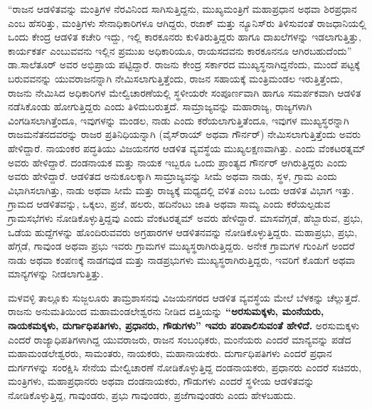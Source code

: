 “ರಾಜನ ಆಡಳಿತವನ್ನು ಮಂತ್ರಿಗಳ ನೆರವಿನಿಂದ ಸಾಗಿಸುತ್ತಿದ್ದನು, ಮುಖ್ಯಮಂತ್ರಿಗೆ ಮಹಾಪ್ರಧಾನ ಅಥವಾ ಶಿರಪ್ರಧಾನ ಎಂಬ ಹೆಸರಿತ್ತು, ಮಂತ್ರಿಗಳು ಸೇನಾಧಿಕಾರಿಗಳೂ ಆಗಿದ್ದರು, ರಜಾಕ್​ ಮತ್ತು ನ್ಯೂನಿಸ್​ರು ತಿಳಿಸುವಂತೆ ರಾಜಧಾನಿಯಲ್ಲಿ ಒಂದು ಕೇಂದ್ರ ಆಡಳಿತ ಕಚೇರಿ ಇದ್ದು, ಇಲ್ಲಿ ಕಾರಕೂನರು ಕುಳಿತಿರುತ್ತಿದ್ದರು ಹಾಗೂ ದಾಖಲೆಗಳನ್ನು ಇಡಲಾಗುತ್ತಿತ್ತು, ಕಾರ್ಯಕರ್ತ ಎಂಬುವವನು ಇಲ್ಲಿನ ಪ್ರಮುಖ ಅಧಿಕಾರಿಯೂ, ರಾಯಸದವನು ಕಾರಕೂನನೂ ಆಗಿರ\-ಬಹುದೆಂದು” ಡಾ.ಸಾಲೆತೂರ್​ ಅವರ ಅಭಿಪ್ರಾಯ ಪಟ್ಟಿದ್ದಾರೆ. ರಾಜನು ಕೇಂದ್ರ ಸರ್ಕಾರದ ಮುಖ್ಯಸ್ಥನಾಗಿದ್ದನೆಂದು, ಮುಂದೆ ಪಟ್ಟಕ್ಕೆ ಬರುವವನನ್ನು ಯುವರಾಜನನ್ನಾಗಿ ನೇಮಿಸಲಾಗುತ್ತಿತ್ತೆಂದು, ರಾಜನ ಸಹಾಯಕ್ಕೆ ಮಂತ್ರಿಮಂಡಲ ಇರುತ್ತಿ\-ತ್ತೆಂದು, ರಾಜನು ನೇಮಿಸಿದ ಅಧಿಕಾರಿಗಳ ಮೇಲ್ವಿಚಾರಣೆಯಲ್ಲಿ ಸ್ಥಳೀಯರೇ ಸಂಪೂರ್ಣವಾಗಿ ಹಾಗೂ ಸಮರ್ಪಕವಾಗಿ ಆಡಳಿತ ನಡೆಸಿಕೊಂಡು ಹೋಗುತ್ತಿದ್ದರು ಎಂದು ತಿಳಿದುಬರುತ್ತದೆ. ಸಾಮ್ರಾಜ್ಯವನ್ನು ಮಹಾರಾಜ್ಯ, ರಾಜ್ಯಗಳಾಗಿ ವಿಂಗಡಿಸಲಾಗಿತ್ತೆಂದೂ, ಇವುಗಳನ್ನು ಮಂಡಲ, ನಾಡು ಎಂದು ಕರೆಯಲಾಗುತ್ತಿತೆಂದೂ, ಇವುಗಳ ಮುಖ್ಯಸ್ಥರನ್ನಾಗಿ ರಾಜಮನೆತನದವರನ್ನು ರಾಜರ ಪ್ರತಿನಿಧಿಯನ್ನಾಗಿ (ವೈಸ್​ರಾಯ್​ ಅಥವಾ ಗೌರ್ನರ್​) ನೇಮಿಸಲಾಗುತ್ತಿತ್ತೆಂದು ಅವರು ಹೇಳಿದ್ದಾರೆ. ನಾಯಂಕರ ಪದ್ಧತಿಯು ವಿಜಯನಗರ ಆಡಳಿತ ವ್ಯವಸ್ಥೆಯ ಮುಖ್ಯಲಕ್ಷಣವಾಗಿತ್ತು.  ಎಂದು ವೆಂಕಟರತ್ನಮ್ ಅವರು ಹೇಳಿದ್ದಾರೆ. ದಂಡನಾಯಕ ಮತ್ತು ನಾಯಕ ಇಬ್ಬರೂ ಒಂದು ಪ್ರಾಂತ್ಯದ ಗೌರ್ನರ್​ ಆಗಿರುತ್ತಿದ್ದರು ಎಂದು ಅವರು ಹೇಳಿದ್ದಾರೆ. ಆಡಳಿತದ ಅನುಕೂಲಕ್ಕಾಗಿ ಸಾಮ್ರಾಜ್ಯವನ್ನು ಸೀಮೆ ಅಥವಾ ನಾಡು, ಸ್ಥಳ, ಗ್ರಾಮ ಎಂದು ವಿಭಾಗಿಸಲಾಗಿತ್ತು, ನಾಡು ಅಥವಾ ಸೀಮೆ ಮತ್ತು ರಾಜ್ಯಕ್ಕೆ ಮಧ್ಯದಲ್ಲಿ ವಳಿತ ಎಂಬ ಒಂದು ಆಡಳಿತ ವಿಭಾಗ ಇತ್ತು. ಗ್ರಾಮದ ಆಡಳಿತವನ್ನು, ಒಕ್ಕಲು, ಪ್ರಜೆ, ಹಲರು, ಹದಿನೆಂಟು ಜಾತಿ ಅಥವಾ ಸಾಮ್ಯ ಎಂದು ಕರೆಯಲ್ಪಡುವ ಗ್ರಾಮಸಭೆಗಳು ನೋಡಿಕೊಳ್ಳುತ್ತಿದ್ದವು ಎಂದು ವೆಂಕಟರತ್ನಮ್ ಅವರು ಹೇಳಿದ್ದಾರೆ. ಮಾಸವೆಗ್ಗಡೆ, ಹೆಬ್ಬಾರುವ, ಪ್ರಭು, ಒಡೆಯ ಹುದ್ದೆಗಳನ್ನು ಹೊಂದಿರುವವರು ಅಗ್ರಹಾರಗಳ ಆಡಳಿತನವನ್ನು ನೋಡಿಕೊಳ್ಳುತ್ತಿದ್ದರು. ಮಹಾಪ್ರಭು, ಪ್ರಭು, ಹೆಗ್ಗಡೆ, ಗಾವುಂಡ ಅಥವಾ ಪ್ರಭು ಇವರು ಗ್ರಾಮಗಳ ಮುಖ್ಯಸ್ಥರಾಗಿರುತ್ತಿದ್ದರು. ಅನೇಕ ಗ್ರಾಮಗಳ ಗುಂಪಿಗೆ ಅಂದರೆ ನಾಡು ಅಥವಾ ಕಂಪಣಕ್ಕೆ ನಾಡಗವುಡ ಮತ್ತು ನಾಡಪ್ರಭುಗಳು ಮುಖ್ಯಸ್ಥರಾಗಿರುತ್ತಿದ್ದರು, ಇವರಿಗೆ ಕೊಡುಗೆ ಅಥವಾ ಮಾನ್ಯಗಳನ್ನು ನೀಡಲಾಗುತ್ತಿತ್ತು.

ಮಳವಳ್ಳಿ ತಾಲ್ಲೂಕು ಸುಜ್ಜಲೂರು ತಾಮ್ರಶಾಸನವು ವಿಜಯನಗರದ ಆಡಳಿತ ವ್ಯವಸ್ಥೆಯ ಮೇಲೆ ಬೆಳಕನ್ನು ಚೆಲ್ಲುತ್ತದೆ. ರಾಜನು ಅನುಮತಿಯಿಂದ ಮಹಾಮಂಡಲೇಶ್ವರನು ನೀಡಿದ ದತ್ತಿಯನ್ನು \textbf{“ಅರಸುಮಕ್ಕಳು, ಮಂನೆಯರು, ನಾಯಕಮಕ್ಕಳು, ದುರ್ಗಾಧಿಪತಿಗಳು, ಪ್ರಧಾನರು, ಗೌಡುಗಳು” ಇವರು ಪರಿಪಾಲಿಸುವಂತೆ ಹೇಳಿದೆ.} ಅರಸುಮಕ್ಕಳು ಎಂದರೆ ರಾಜ್ಯಾಧಿಪತಿ\-ಗಳಾಗಿದ್ದ ಯುವರಾಜರು, ರಾಜನ ಸಂಬಂಧಿಕರು, ಮಂನೆಯರು ಎಂದರೆ ಮಾನ್ಯವನ್ನು ಪಡೆದ ಮಹಾಮಂಡಲೇಶ್ವರರು, ಸಾಮಂತರು, ನಾಯಕರು, ಮಹಾನಾಯಕರು. ದುರ್ಗಾಧಿಪತಿಗಳು ಎಂದರೆ ಪ್ರಧಾನ ದುರ್ಗಗಳನ್ನು ಸಂರಕ್ಷಿಸಿ ಸೇನೆಯ ಮೇಲ್ವಿಚಾರಣೆ ನೋಡಿಕೊಳ್ಳುತ್ತಿದ್ದ ದಂಡನಾಯಕರು, ಪ್ರಧಾನರು ಎಂದರೆ ಸಚಿವರು, ಮಂತ್ರಿಗಳು, ಮಹಾಪ್ರಧಾನರು ಅಥವಾ ದಂಡನಾಯಕರು, ಗೌಡುಗಳು ಎಂದರೆ ಸ್ಥಳೀಯ ಆಡಳಿತವನ್ನು ನೋಡಿಕೊಳ್ಳುತ್ತಿದ್ದ, ಗಾವುಂಡರು, ಪ್ರಭು ಗಾವುಂಡರು, ಪ್ರಜೆಗಾವುಂಡರು ಎಂದು ಹೇಳಬಹುದು.


